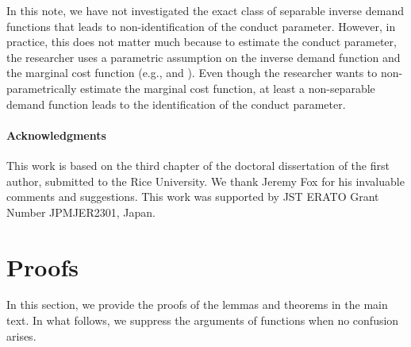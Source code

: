 \documentclass[11pt, a4paper]{article}
\theoremstyle{remark}
\begin{document}
In this note, we have not investigated the exact class of separable inverse demand functions that leads to non-identification of the conduct parameter.
However, in practice, this does not matter much because to estimate the conduct parameter, the researcher uses a parametric assumption on the inverse demand function and the marginal cost function (e.g., \citet{okazaki2022excess} and \citet{matsumura2024loglinear}).
Even though the researcher wants to non-parametrically estimate the marginal cost function, at least a non-separable demand function leads to the identification of the conduct parameter.

\paragraph{Acknowledgments}
This work is based on the third chapter of the doctoral dissertation of the first author, submitted to the Rice University.
We thank Jeremy Fox for his invaluable comments and suggestions.
This work was supported by JST ERATO Grant Number JPMJER2301, Japan.  


\newpage



\appendix

\section{Proofs}\label{appendix:proof}
In this section, we provide the proofs of the lemmas and theorems in the main text.
In what follows, we suppress the arguments of functions when no confusion arises.
\end{document}
